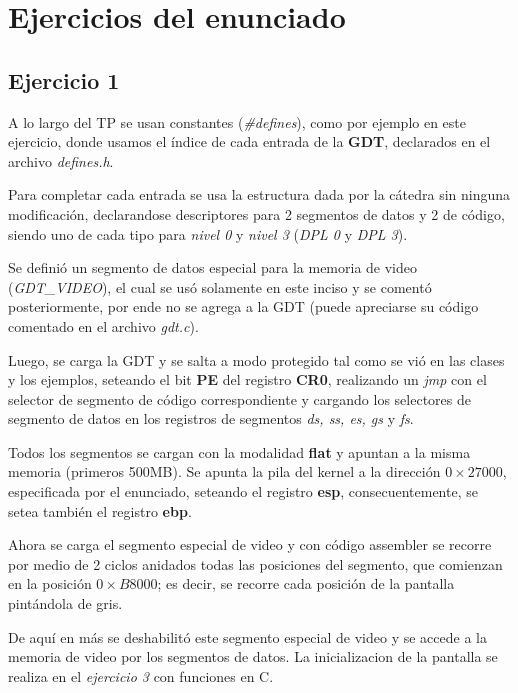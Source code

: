 \section{Ejercicios del enunciado}

\subsection{Ejercicio 1}

A lo largo del TP se usan constantes ({\it \#defines\/}), como por ejemplo
en este ejercicio, donde usamos el índice de cada entrada de la {\bf GDT}, declarados
en el archivo {\it defines.h\/}.

Para completar cada entrada se usa la estructura dada por la cátedra sin
ninguna modificación, declarandose descriptores para 2 segmentos de datos y 2 de
código, siendo uno de cada tipo para {\it nivel 0\/} y {\it nivel 3\/}
({\it DPL 0\/} y {\it DPL 3\/}).


Se definió un segmento de datos especial para la memoria de video
({\it GDT_VIDEO\/}), el cual se usó solamente en este inciso y se comentó
posteriormente, por ende no se agrega a la GDT (puede apreciarse su código
comentado en el archivo {\it gdt.c\/}).

Luego, se carga la GDT y se salta a modo protegido tal como se vió en las clases
y los ejemplos, seteando el bit {\bf PE} del registro {\bf CR0}, realizando un
{\it jmp\/} con el selector de segmento de código correspondiente y cargando los
selectores de segmento de datos en los registros de segmentos {\it ds, ss, es,
gs\/} y {\it fs\/}.

Todos los segmentos se cargan con la modalidad {\bf flat} y apuntan a la misma
memoria (primeros 500MB). Se apunta la pila del kernel a la dirección
$0\times27000$, especificada por el enunciado, seteando el registro {\bf esp},
consecuentemente, se setea también el registro {\bf ebp}.

Ahora se carga el segmento especial de video y con código assembler se recorre
por medio de 2 ciclos anidados todas las posiciones del segmento, que comienzan
en la posición $0\times B8000$; es decir, se recorre cada posición de la
pantalla pintándola de gris.

De aquí en más se deshabilitó este segmento especial de video y se accede a la
memoria de video por los segmentos de datos. La inicializacion de la pantalla
se realiza en el {\it ejercicio 3\/} con funciones en C.


